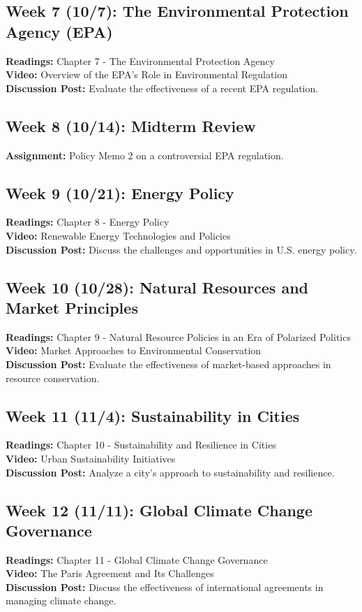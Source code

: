 \documentclass[12pt, letterpaper]{article}
\begin{document}
\subsection*{Week 7 (10/7): The Environmental Protection Agency (EPA)}
\textbf{Readings:} Chapter 7 - The Environmental Protection Agency\\
\textbf{Video:} Overview of the EPA's Role in Environmental Regulation\\
\textbf{Discussion Post:} Evaluate the effectiveness of a recent EPA regulation.

\subsection*{Week 8 (10/14): Midterm Review}
\textbf{Assignment:} Policy Memo 2 on a controversial EPA regulation.

\subsection*{Week 9 (10/21): Energy Policy}
\textbf{Readings:} Chapter 8 - Energy Policy\\
\textbf{Video:} Renewable Energy Technologies and Policies\\
\textbf{Discussion Post:} Discuss the challenges and opportunities in U.S. energy policy.

\subsection*{Week 10 (10/28): Natural Resources and Market Principles}
\textbf{Readings:} Chapter 9 - Natural Resource Policies in an Era of Polarized Politics\\
\textbf{Video:} Market Approaches to Environmental Conservation\\
\textbf{Discussion Post:} Evaluate the effectiveness of market-based approaches in resource conservation.

\subsection*{Week 11 (11/4): Sustainability in Cities}
\textbf{Readings:} Chapter 10 - Sustainability and Resilience in Cities\\
\textbf{Video:} Urban Sustainability Initiatives\\
\textbf{Discussion Post:} Analyze a city’s approach to sustainability and resilience.

\subsection*{Week 12 (11/11): Global Climate Change Governance}
\textbf{Readings:} Chapter 11 - Global Climate Change Governance\\
\textbf{Video:} The Paris Agreement and Its Challenges\\
\textbf{Discussion Post:} Discuss the effectiveness of international agreements in managing climate change.
\end{document}
